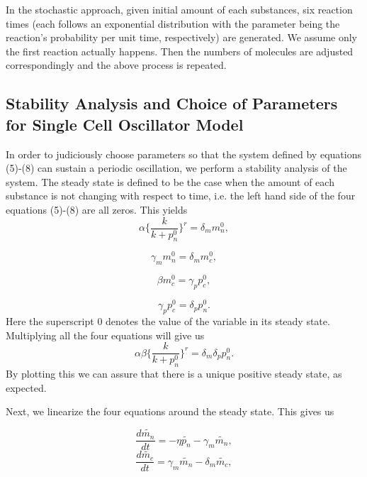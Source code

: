 \documentclass[12pt]{article}
\renewcommand{\(}{\left (}
\renewcommand{\)}{\right )}
\begin{document}
In the stochastic approach, given initial amount of each substances, six reaction times (each follows an exponential distribution with the parameter being the reaction's probability per unit time, respectively) are generated. We assume only the first reaction actually happens. Then the numbers of molecules are adjusted correspondingly and the above process is repeated.

\subsection{Stability Analysis and Choice of Parameters for Single Cell Oscillator Model}
\hspace{5mm} In order to judiciously choose parameters so that the system defined by equations (5)-(8) can sustain a periodic oscillation, we perform a stability analysis of the system. The steady state is defined to be the case when the amount of each substance is not changing with respect to time, i.e. the left hand side of the four equations (5)-(8) are all zeros. This yields
\begin{equation}
	\alpha \{\frac{k}{k + p_n^0}\}^r = \delta_m m_n^0,
\end{equation}

\begin{equation}
    \gamma_m m_n^0 = \delta_m m_c^0,
\end{equation}

\begin{equation}
	\beta m_c^0 = \gamma_p p_c^0,
\end{equation}

\begin{equation}
	\gamma_p p_c^0 = \delta_p p_n^0.
\end{equation}
Here the superscript $0$ denotes the value of the variable in its steady state. Multiplying all the four equations will give us
\begin{equation}
    \alpha \beta \{\frac{k}{k + p_n^0}\}^r = \delta_m \delta_p p_n^0.
\end{equation}
By plotting this we can assure that there is a unique positive steady state, as expected.

Next, we linearize the four equations around the steady state. This gives us

\begin{equation}
    \frac{d\widetilde{m_n}}{dt} = -\eta \widetilde{p_n} - \gamma_m \widetilde{m_n},
\end{equation}
\begin{equation}
	\frac{d \widetilde{m_c}}{dt} = \gamma_m \widetilde{m_n} - \delta_m \widetilde{m_c},
\end{equation}
\end{document}
